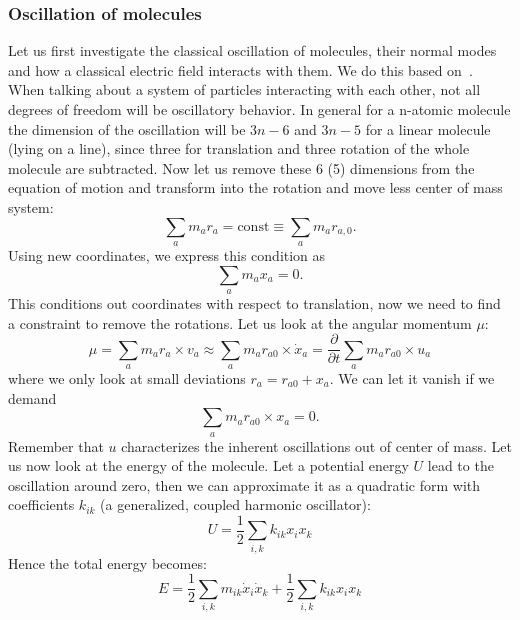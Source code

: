 \subsubsection{Oscillation of molecules}
\label{ssub:Oscillation_of_molecules}
Let us first investigate the classical oscillation of molecules, their normal modes and how a classical 
electric field interacts with them. We do this based on~\cite{landau1997mechanik}. When talking about a system of 
particles interacting with each other, not all degrees
of freedom will be oscillatory behavior. In general for a n-atomic molecule 
the dimension of the oscillation will be $3n - 6$ and $3n -5$ for a linear molecule (lying on a line), since three for
translation and three rotation of the whole molecule are subtracted. Now let us remove these 6 (5) dimensions from the
equation of motion and transform into the rotation and move less center of mass system:
\begin{equation}
    \sum_a m_a r_a = \mathrm{const} \equiv \sum_a m_a r_{a,0}.
\end{equation}
Using new coordinates, we express this condition as
\begin{equation}
    \sum_a m_a x_a = 0.
\end{equation}
This conditions out coordinates with respect to translation, now we need to find a constraint
to remove the rotations. Let us look at the angular momentum $\mu$: 
\begin{equation}
    \mu = \sum_a m_a r_a \times v_a \approx \sum_a m_a r_{a 0} \times \dot{x}_a = \frac{\partial}{\partial t}
    \sum_a m_a r_{a 0} \times u_a
\end{equation}
where we only look at small deviations $r_a = r_{a0} + x_a$. We can let it vanish if we demand
\begin{equation}
    \sum_a m_a r_{a0} \times x_a = 0.
\end{equation}
Remember that $u$ characterizes the inherent oscillations out of center of mass. Let us now
look at the energy of the molecule. Let a potential energy $U$ lead to the oscillation around zero,
then we can approximate it as a quadratic form with coefficients $k_{ik}$ (a generalized, coupled
harmonic oscillator):
\begin{equation}
    U = \frac{1}{2} \sum_{i,k} k_{ik} x_i x_k
\end{equation}
Hence the total energy becomes:
\begin{equation}
    E = \frac{1}{2} \sum_{i,k} m_{ik} \dot{x}_i\dot{x}_k + \frac{1}{2} \sum_{i,k} k_{ik} x_i x_k   
\end{equation}
